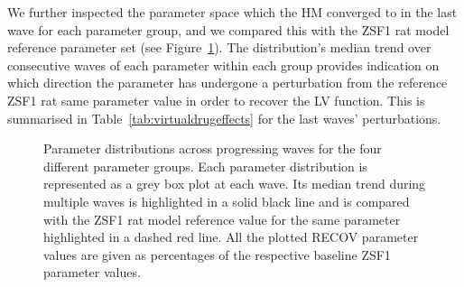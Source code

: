 \vspace{0.2cm}
We further inspected the parameter space which the HM converged to in the last wave for each parameter group, and we compared this with the ZSF1 rat model reference parameter set (see Figure~\ref{fig:paramsdistr}). The distribution's median trend over consecutive waves of each parameter within each group provides indication on which direction the parameter has undergone a perturbation from the reference ZSF1 rat same parameter value in order to recover the LV function. This is summarised in Table~\ref{tab:virtualdrugeffects} for the last waves' perturbations.

\begin{figure}[ht!]
    \myfloatalign
    \quad
    \quad
    \quad
    \caption{Parameter distributions across progressing waves for the four different parameter groups. Each parameter distribution is represented as a grey box plot at each wave. Its median trend during multiple waves is highlighted in a solid black line and is compared with the ZSF1 rat model reference value for the same parameter highlighted in a dashed red line. All the plotted RECOV parameter values are given as percentages of the respective baseline ZSF1 parameter values.}
    \label{fig:paramsdistr}
\end{figure}

